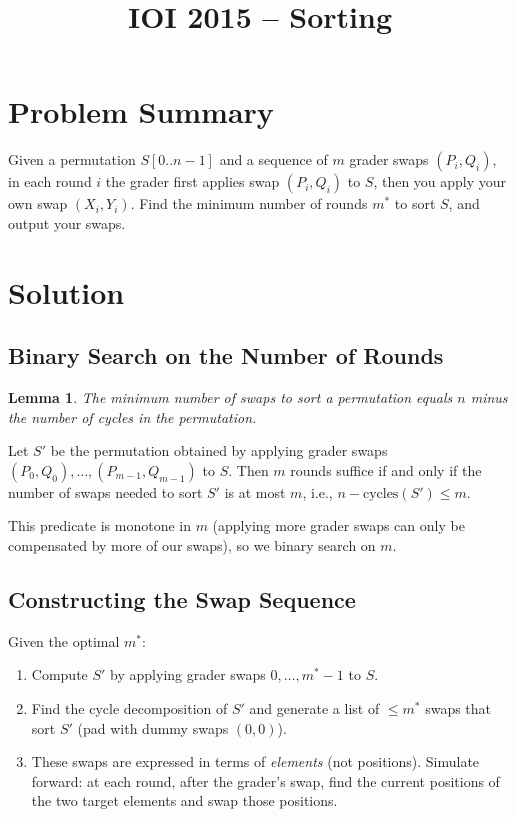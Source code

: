 \documentclass[11pt,a4paper]{article}
\title{IOI 2015 -- Sorting}
\author{}
\date{}
\newtheorem{lemma}[theorem]{Lemma}
\begin{document}
\maketitle

\section{Problem Summary}

Given a permutation $S[0..n{-}1]$ and a sequence of $m$ grader swaps $(P_i, Q_i)$, in each round $i$ the grader first applies swap $(P_i, Q_i)$ to $S$, then you apply your own swap $(X_i, Y_i)$. Find the minimum number of rounds $m^*$ to sort $S$, and output your swaps.

\section{Solution}

\subsection{Binary Search on the Number of Rounds}

\begin{lemma}
The minimum number of swaps to sort a permutation equals $n$ minus the number of cycles in the permutation.
\end{lemma}

Let $S'$ be the permutation obtained by applying grader swaps $(P_0,Q_0), \ldots, (P_{m-1}, Q_{m-1})$ to $S$. Then $m$ rounds suffice if and only if the number of swaps needed to sort $S'$ is at most $m$, i.e., $n - \text{cycles}(S') \le m$.

This predicate is monotone in $m$ (applying more grader swaps can only be compensated by more of our swaps), so we binary search on $m$.

\subsection{Constructing the Swap Sequence}

Given the optimal $m^*$:
\begin{enumerate}
  \item Compute $S'$ by applying grader swaps $0, \ldots, m^*{-}1$ to $S$.
  \item Find the cycle decomposition of $S'$ and generate a list of $\le m^*$ swaps that sort $S'$ (pad with dummy swaps $(0,0)$).
  \item These swaps are expressed in terms of \emph{elements} (not positions). Simulate forward: at each round, after the grader's swap, find the current positions of the two target elements and swap those positions.
\end{enumerate}
\end{document}

